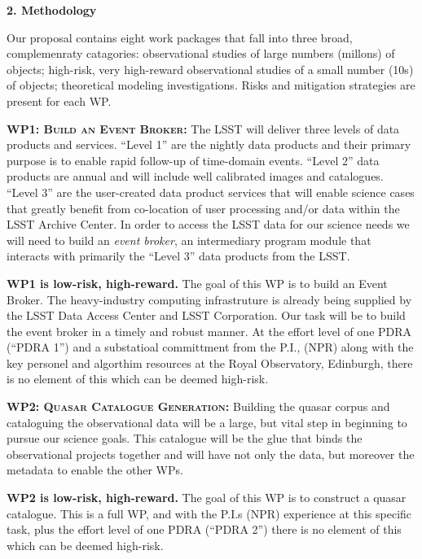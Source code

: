 \documentclass[oneside, a4paper, onecolumn, 11pt]{article}
\begin{document}
\medskip
\medskip
\noindent
\large
{\bf{\textcolor{Cerulean}{2. Methodology}}}
\normalsize

\noindent
Our proposal contains eight work packages that fall into three broad,
complemenraty catagories: observational studies of large numbers
(millons) of objects; high-risk, very high-reward observational
studies of a small number (10s) of objects; theoretical modeling
investigations. Risks and mitigation strategies are present for each
WP.


\smallskip
\smallskip
\noindent
\textbf{\textsc{WP1: Build an Event Broker:}} 
The LSST will deliver three levels of data products and
services. ``Level 1'' are the nightly data products and their primary
purpose is to enable rapid follow-up of time-domain events. ``Level
2'' data products are annual and will include well calibrated images
and catalogues. ``Level 3'' are the user-created data product services
that will enable science cases that greatly benefit from co-location
of user processing and/or data within the LSST Archive Center. In
order to access the LSST data for our science needs we will need to
build an {\it event broker}, an intermediary program module that
interacts with primarily the ``Level 3'' data products from the LSST.

\noindent
{\bf WP1 is low-risk, high-reward.} 
The goal of this WP is to build an Event Broker.  The heavy-industry
computing infrastruture is already being supplied by the LSST Data
Access Center and LSST Corporation. Our task will be to build the
event broker in a timely and robust manner. At the effort level of one
PDRA (``PDRA 1'') and a substatioal committment from the P.I., (NPR)
along with the key personel and algorthim resources at the Royal
Observatory, Edinburgh, there is no element of this which can be
deemed high-risk.


\smallskip
\smallskip
\noindent
\textbf{\textsc{WP2: Quasar Catalogue Generation:}} 
Building the quasar corpus and cataloguing the observational data will
be a large, but vital step in beginning to pursue our science
goals. This catalogue will be the glue that binds the observational
projects together and will have not only the data, but moreover the
metadata to enable the other WPs.

\noindent
{\bf WP2 is low-risk, high-reward.}
The goal of this WP is to construct a quasar catalogue.
This is a full WP, and with the P.I.s (NPR) experience at this
specific task, plus the effort level of one PDRA (``PDRA 2'') there is
no element of this which can be deemed high-risk.
\end{document}
